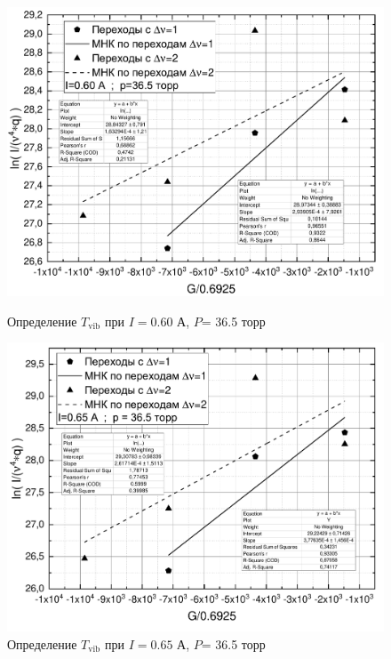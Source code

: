 \begin{figure}[h]
	\begin{minipage}{0.93\linewidth}
		\vspace{-2cm}
		\centering
		\includegraphics[width=\linewidth]{data/graph_T_vib_60}
		\caption{Определение $T_\text{vib}$ при $I= 0.60$ А, $P$= 36.5 торр}
		\label{fig:T_rot_60}
	\end{minipage} 
	\begin{minipage}{0.93\linewidth}
		\centering
		\includegraphics[width=\linewidth]{data/graph_T_vib_65}
		\caption{Определение $T_\text{vib}$ при $I= 0.65$ А, $P$= 36.5 торр}
		\label{fig:T_rot_65}
	\end{minipage}
\end{figure}